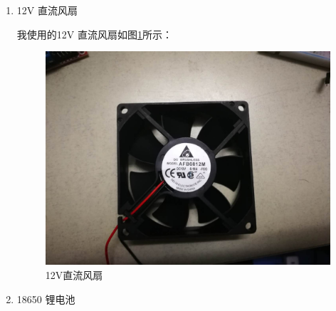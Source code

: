 \documentclass{article}
\begin{document}
\begin{spacing}{1.5}
\begin{enumerate}
    \item 12V 直流风扇
    
    我使用的12V 直流风扇如图\ref{fig:module9}所示：
    \begin{figure}[H]
        \centering
        \includegraphics[scale=0.1]{fig/result/module9.png}
        \caption{12V直流风扇}
        \label{fig:module9}
    \end{figure}

    \item 18650 锂电池
    

\end{enumerate}
\end{spacing}
\end{document}
